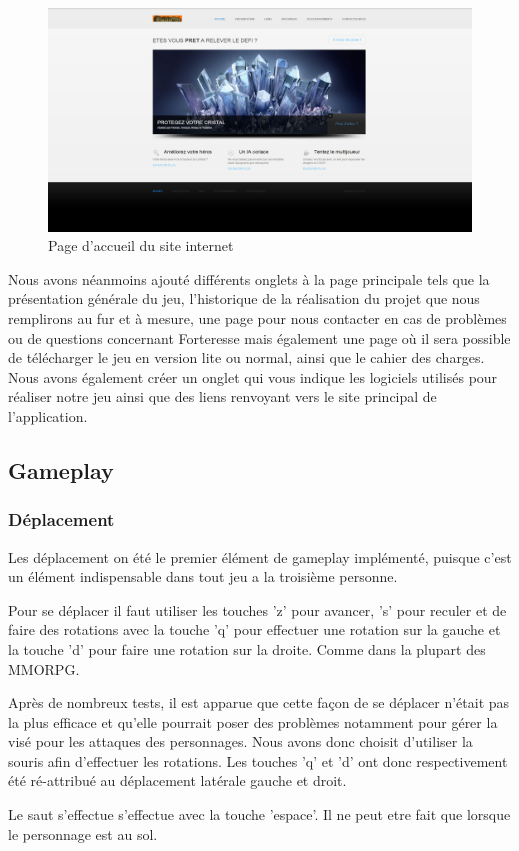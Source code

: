 \documentclass[a4paper, 12pt]{article}
\begin{document}
	\begin{figure}[!ht]
		\centerline{\includegraphics[scale=0.3]{siteprojet.png}}
		\caption*{Page d'accueil du site internet}
	\end{figure}	 
	 
	 Nous avons néanmoins ajouté différents onglets à la page principale tels que la présentation générale du jeu, l’historique de la réalisation du projet que nous remplirons au fur et à mesure, une page pour nous contacter en cas de problèmes ou de questions concernant Forteresse mais également une page où il sera possible de télécharger le jeu en version lite ou normal, ainsi que le cahier des charges. Nous avons également créer un onglet qui vous indique les logiciels utilisés pour réaliser notre jeu ainsi que des liens renvoyant vers le site principal de l’application.

	\subsection{Gameplay}
		\subsubsection{Déplacement}
		Les déplacement on été le premier élément de gameplay implémenté, puisque c'est un élément indispensable dans tout jeu a la troisième personne.
		\par Pour se déplacer il faut utiliser les touches 'z' pour avancer, 's' pour reculer et de faire des rotations avec la touche 'q' pour effectuer une rotation sur la gauche et la touche 'd' pour faire une rotation sur la droite. Comme dans la plupart des MMORPG.
		\par Après de nombreux tests, il est apparue que cette façon de se déplacer n'était pas la plus efficace et qu'elle pourrait poser des problèmes notamment pour gérer la visé pour les attaques des personnages. Nous avons donc choisit d'utiliser la souris afin d'effectuer les rotations. Les touches 'q' et 'd' ont donc respectivement été ré-attribué au déplacement latérale gauche et droit.
		\par Le saut s'effectue s'effectue avec la touche 'espace'. Il ne peut etre fait que lorsque le personnage est au sol.  
\end{document}
